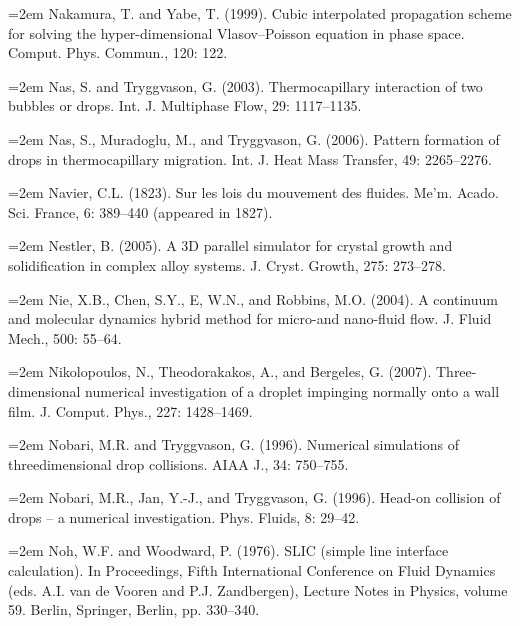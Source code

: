\documentclass[11pt,a4paper,openany,fontset=none]{ctexbook}
\begin{document}
\par\hangindent=2em Nakamura, T. and Yabe, T. (1999). Cubic interpolated propagation scheme for solving the hyper-dimensional Vlasov--Poisson equation in phase space. Comput. Phys. Commun., 120: 122.

\par\hangindent=2em Nas, S. and Tryggvason, G. (2003). Thermocapillary interaction of two bubbles or drops. Int. J. Multiphase Flow, 29: 1117--1135.

\par\hangindent=2em Nas, S., Muradoglu, M., and Tryggvason, G. (2006). Pattern formation of drops in thermocapillary migration. Int. J. Heat Mass Transfer, 49: 2265--2276.

\par\hangindent=2em Navier, C.L. (1823). Sur les lois du mouvement des fluides. Me'm. Acado. Sci. France, 6: 389--440 (appeared in 1827).

\par\hangindent=2em Nestler, B. (2005). A 3D parallel simulator for crystal growth and solidification in complex alloy systems. J. Cryst. Growth, 275: 273--278.

\par\hangindent=2em Nie, X.B., Chen, S.Y., E, W.N., and Robbins, M.O. (2004). A continuum and molecular dynamics hybrid method for micro-and nano-fluid flow. J. Fluid Mech., 500: 55--64.


\par\hangindent=2em Nikolopoulos, N., Theodorakakos, A., and Bergeles, G. (2007). Three-dimensional numerical investigation of a droplet impinging normally onto a wall film. J. Comput. Phys., 227: 1428--1469.

\par\hangindent=2em Nobari, M.R. and Tryggvason, G. (1996). Numerical simulations of threedimensional drop collisions. AIAA J., 34: 750--755.

\par\hangindent=2em Nobari, M.R., Jan, Y.-J., and Tryggvason, G. (1996). Head-on collision of drops -- a numerical investigation. Phys. Fluids, 8: 29--42.

\par\hangindent=2em Noh, W.F. and Woodward, P. (1976). SLIC (simple line interface calculation). In Proceedings, Fifth International Conference on Fluid Dynamics (eds. A.I. van de Vooren and P.J. Zandbergen), Lecture Notes in Physics, volume 59. Berlin, Springer, Berlin, pp. 330--340.
\end{document}
